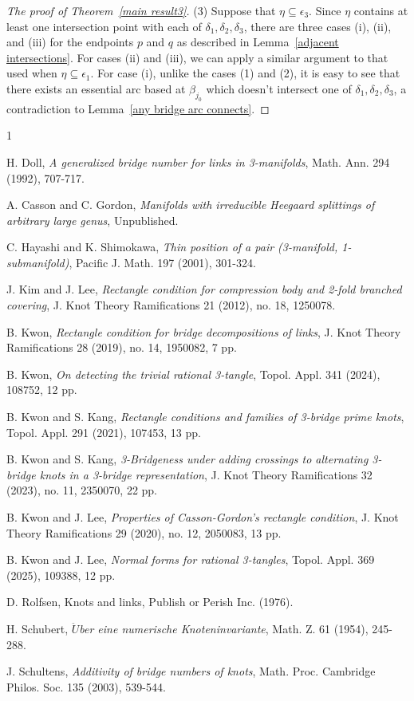 \documentclass[12pt]{amsart}
\newcommand{\be}{\beta}
\newcommand{\ep}{\epsilon}
\newcommand{\del}{\delta}
\begin{document}
\begin{proof}[The proof of Theorem~\emph{\ref{main result3}}]
(3) Suppose that $\eta\subseteq \ep_3$.
Since $\eta$ contains at least one intersection point with each of $\del_1, \del_2, \del_3$,
there are three cases (i), (ii), and (iii) for the endpoints $p$ and $q$ as described in Lemma~\ref{adjacent intersections}.
For cases (ii) and (iii), we can apply a similar argument to that used when $\eta\subseteq \ep_1$.
For case (i), unlike the cases (1) and (2), it is easy to see that there exists an essential arc based at $\be_{j_0}$ which doesn't intersect one of $\del_1, \del_2, \del_3$, a contradiction to Lemma~\ref{any bridge arc connects}.
\end{proof}
	



\begin{thebibliography}{1}

 H. Doll, {\em A generalized bridge number for links in 3-manifolds}, Math. Ann. 294 (1992), 707-717.

 A. Casson and  C. Gordon, {\em Manifolds with irreducible Heegaard splittings of arbitrary large genus}, Unpublished.

 C. Hayashi and K. Shimokawa, {\em Thin position of a pair (3-manifold, 1-submanifold)}, Pacific J. Math. 197 (2001), 301-324.

 J. Kim and J. Lee, {\em Rectangle condition for compression body and 2-fold branched covering}, J. Knot Theory Ramifications 21 (2012), no. 18, 1250078.

 B. Kwon, {\em Rectangle condition for bridge decompositions of links}, J. Knot Theory Ramifications 28 (2019), no. 14, 1950082, 7 pp.

 B. Kwon, {\em On detecting the trivial rational 3-tangle}, Topol. Appl. 341 (2024), 108752, 12 pp.

 B. Kwon and S. Kang, {\em Rectangle conditions and families of 3-bridge prime knots}, Topol. Appl. 291 (2021), 107453, 13 pp.

 B. Kwon and S. Kang, {\em 3-Bridgeness under adding crossings to alternating 3-bridge knots in a 3-bridge representation}, J. Knot Theory Ramifications 32 (2023), no. 11, 2350070, 22 pp.

 B. Kwon and J. Lee, {\em Properties of Casson-Gordon's rectangle condition}, J. Knot Theory Ramifications 29 (2020), no. 12, 2050083, 13 pp.

 B. Kwon and J. Lee, {\em Normal forms for rational 3-tangles}, Topol. Appl. 369 (2025), 109388, 12 pp.

 D. Rolfsen, Knots and links, Publish or Perish Inc. (1976).

 H. Schubert, {\em $\ddot{U}$ber eine numerische Knoteninvariante}, Math. Z. 61 (1954), 245-288.

 J. Schultens, {\em Additivity of bridge numbers of knots}, Math. Proc. Cambridge Philos. Soc. 135 (2003), 539-544.

\end{thebibliography}
\end{document}
